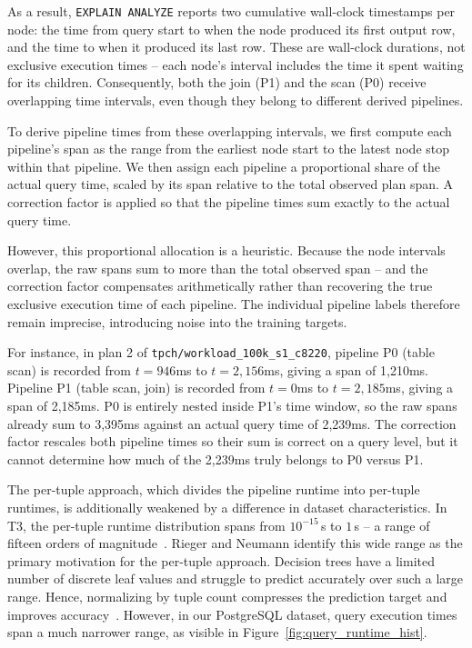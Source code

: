 As a result, \texttt{EXPLAIN ANALYZE} reports two cumulative wall-clock timestamps per node:
the time from query start to when the node produced its first output row,
and the time to when it produced its last row.
These are wall-clock durations, not exclusive execution times --
each node's interval includes the time it spent waiting for its children.
Consequently, both the join (P1) and the scan (P0) receive overlapping time intervals,
even though they belong to different derived pipelines.

To derive pipeline times from these overlapping intervals,
we first compute each pipeline's span as the range from the earliest node start to the latest node stop within that pipeline.
We then assign each pipeline a proportional share of the actual query time,
scaled by its span relative to the total observed plan span.
A correction factor is applied so that the pipeline times sum exactly to the actual query time.

However, this proportional allocation is a heuristic.
Because the node intervals overlap, the raw spans sum to more than the total observed span --
and the correction factor compensates arithmetically rather than recovering the true exclusive execution time of each pipeline.
The individual pipeline labels therefore remain imprecise,
introducing noise into the training targets.

For instance, in plan 2 of \texttt{tpch/workload\_100k\_s1\_c8220},
pipeline P0 (table scan) is recorded from $t = 946$ms to $t = 2{,}156$ms,
giving a span of 1{,}210ms.
Pipeline P1 (table scan, join) is recorded from $t = 0$ms to $t = 2{,}185$ms,
giving a span of 2{,}185ms.
P0 is entirely nested inside P1's time window,
so the raw spans already sum to 3{,}395ms against an actual query time of 2{,}239ms.
The correction factor rescales both pipeline times so their sum is correct on a query level,
but it cannot determine how much of the 2{,}239ms truly belongs to P0 versus P1.

The per-tuple approach, which divides the pipeline runtime into per-tuple runtimes, is additionally weakened by a difference in dataset characteristics.
In T3, the per-tuple runtime distribution spans from $10^{-15}$\,s to $1$\,s -- a range of fifteen orders of magnitude~\parencite{t3}.
Rieger and Neumann identify this wide range as the primary motivation for the per-tuple approach.
Decision trees have a limited number of discrete leaf values and
struggle to predict accurately over such a large range.
Hence, normalizing by tuple count compresses the prediction target and improves accuracy~\parencite{t3}.
However, in our PostgreSQL dataset, query execution times span a much narrower range,
as visible in Figure~\ref{fig:query_runtime_hist}.

